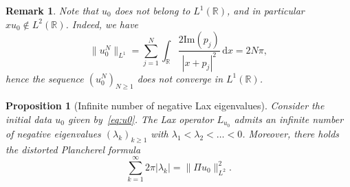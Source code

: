 \documentclass[english, 12pt]{amsart}%
\newcommand{\R}{\mathbb{R}}
\newcommand{\dd}{\,\mathrm{d}}
\renewcommand{\Im}{\mathrm{Im}}
\newtheorem{proposition}[definition]{Proposition}
\newtheorem{remark}[definition]{Remark}
\numberwithin{equation}{section}
\begin{document}
\begin{remark}
Note that $u_0$ does not belong to $L^1(\R)$, and in particular $xu_0\not\in L^2(\R)$. Indeed, we have
\[
\|u_0^N\|_{L^1}
	=\sum_{j=1}^N \int_{\R}\frac{2\Im(p_j)}{|x+p_j|^2}\dd x=2N\pi,
\] 
hence the sequence $(u_0^N)_{N\geq 1}$ does not converge in $L^1(\R)$.
\end{remark}


\begin{proposition}[Infinite number of negative Lax eigenvalues]
Consider the initial data $u_0$ given by~\eqref{eq:u0}. The Lax operator $L_{u_0}$ admits an infinite number of negative eigenvalues $(\lambda_k)_{k\geq 1}$ with $\lambda_1<\lambda_2<\dots<0$. Moreover, there holds the distorted Plancherel formula
\begin{equation}\label{eq:Plancherel}
\sum_{k= 1}^{\infty}2\pi|\lambda_k|=\|\Pi u_0\|_{L^2}^2.
\end{equation}
\end{proposition}
\end{document}
